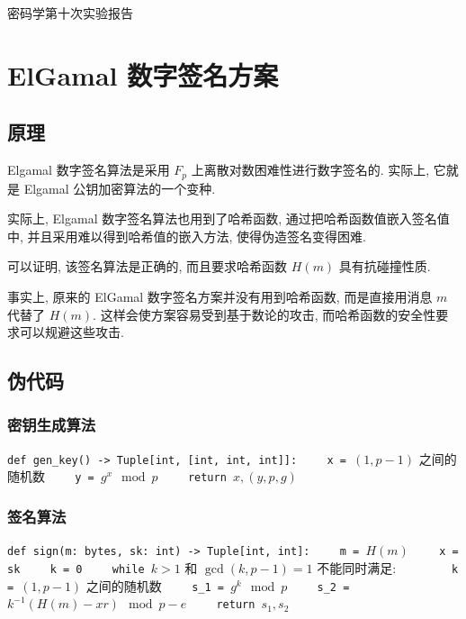 \documentclass[12pt,a4paper]{article}
\begin{document}
{
\titlefont
\begin{center}
密码学第十次实验报告
\end{center}
}

\section*{ElGamal 数字签名方案}

\subsection*{原理}

Elgamal 数字签名算法是采用 $ F_p $ 上离散对数困难性进行数字签名的. 实际上, 它就是 Elgamal 公钥加密算法的一个变种. 

实际上, Elgamal 数字签名算法也用到了哈希函数, 通过把哈希函数值嵌入签名值中, 并且采用难以得到哈希值的嵌入方法, 使得伪造签名变得困难. 

可以证明, 该签名算法是正确的, 而且要求哈希函数 $ H(m) $ 具有抗碰撞性质.  

事实上, 原来的 ElGamal 数字签名方案并没有用到哈希函数, 而是直接用消息 $ m $ 代替了 $ H(m) $. 这样会使方案容易受到基于数论的攻击, 而哈希函数的安全性要求可以规避这些攻击. 

\subsection*{伪代码}

\subsubsection*{密钥生成算法}

{
\noindent
\lstinline{def gen_key() -> Tuple[int, [int, int, int]]:}
\newline
\lstinline{    x = }$ (1, p - 1) $ 之间的随机数
\newline
\lstinline{    y = }$ g^x \mod p $
\newline
\lstinline{    return }$ x, (y, p, g) $
}

\subsubsection*{签名算法}

{
\noindent
\lstinline{def sign(m: bytes, sk: int) -> Tuple[int, int]:}
\newline
\lstinline{    m = }$ H(m) $
\newline
\lstinline{    x = sk}
\newline
\lstinline{    k = 0}
\newline
\lstinline{    while }$ k > 1 $ 和 $ \gcd(k, p - 1) = 1 $ 不能同时满足:
\newline
\lstinline{        k = }$ (1, p - 1) $ 之间的随机数
\newline
\lstinline{    s_1 = }$ g^k \mod p $
\newline
\lstinline{    s_2 = }$ k^{-1}(H(m) - xr) \mod p - e $
\newline
\lstinline{    return }$ s_1, s_2 $
}
\end{document}
